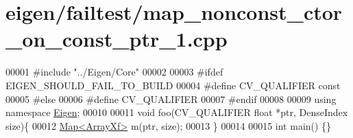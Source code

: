 \hypertarget{eigen_2failtest_2map__nonconst__ctor__on__const__ptr__1_8cpp_source}{}\section{eigen/failtest/map\+\_\+nonconst\+\_\+ctor\+\_\+on\+\_\+const\+\_\+ptr\+\_\+1.cpp}
\label{eigen_2failtest_2map__nonconst__ctor__on__const__ptr__1_8cpp_source}

\begin{DoxyCode}
00001 \textcolor{preprocessor}{#include "../Eigen/Core"}
00002 
00003 \textcolor{preprocessor}{#ifdef EIGEN\_SHOULD\_FAIL\_TO\_BUILD}
00004 \textcolor{preprocessor}{#define CV\_QUALIFIER const}
00005 \textcolor{preprocessor}{#else}
00006 \textcolor{preprocessor}{#define CV\_QUALIFIER}
00007 \textcolor{preprocessor}{#endif}
00008 
00009 \textcolor{keyword}{using namespace }\hyperlink{namespace_eigen}{Eigen};
00010 
00011 \textcolor{keywordtype}{void} foo(CV\_QUALIFIER \textcolor{keywordtype}{float} *ptr, DenseIndex size)\{
00012     \hyperlink{group___core___module_class_eigen_1_1_map}{Map<ArrayXf>} m(ptr, size);
00013 \}
00014 
00015 \textcolor{keywordtype}{int} main() \{\}
\end{DoxyCode}
